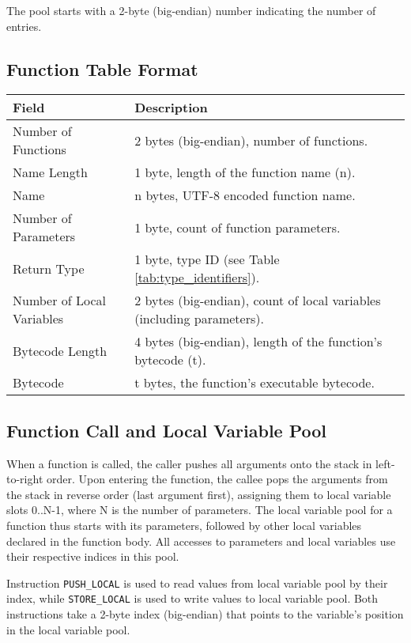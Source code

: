 \documentclass[a4paper,12pt]{article}
\begin{document}
  The pool starts with a 2-byte (big-endian) number indicating the number of entries.

\subsection{Function Table Format}
\begin{tabular}{|l|p{9cm}|}
\hline
\textbf{Field} & \textbf{Description} \\ \hline
  Number of Functions & 2 bytes (big-endian), number of functions. \\ \hline
  Name Length & 1 byte, length of the function name (n). \\ \hline
  Name & n bytes, UTF-8 encoded function name. \\ \hline
  Number of Parameters & 1 byte, count of function parameters. \\ \hline
  Return Type & 1 byte, type ID (see Table \ref{tab:type_identifiers}). \\ \hline
  Number of Local Variables & 2 bytes (big-endian), count of local variables (including parameters). \\ \hline
  Bytecode Length & 4 bytes (big-endian), length of the function's bytecode (t). \\ \hline
  Bytecode & t bytes, the function's executable bytecode. \\ \hline
\end{tabular}
\label{tab:function_table_format}

\subsection{Function Call and Local Variable Pool}
  When a function is called, the caller pushes all arguments onto the stack in left-to-right order. Upon entering the function, the callee pops the arguments from the stack in reverse order (last argument first), assigning them to local variable slots 0..N-1, where N is the number of parameters. The local variable pool for a function thus starts with its parameters, followed by other local variables declared in the function body. All accesses to parameters and local variables use their respective indices in this pool.

  Instruction \texttt{PUSH\_LOCAL} is used to read values from local variable pool by their index, while \texttt{STORE\_LOCAL} is used to write values to local variable pool. Both instructions take a 2-byte index (big-endian) that points to the variable's position in the local variable pool.
\end{document}
